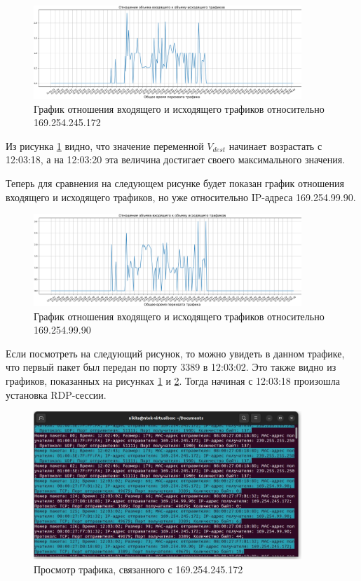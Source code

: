 \documentclass[bachelor, och, coursework]{SCWorks}
\begin{document}
  \begin{figure}[H]
    \centering
    \includegraphics[width=0.9\textwidth]{photo/clnt1.png}
    \caption{График отношения входящего и исходящего трафиков относительно 169.254.245.172}
    \label{clnt1}
  \end{figure}

  Из рисунка \ref{clnt1} видно, что значение переменной $V_{dest}$ начинает возрастать с 12:03:18, а на 12:03:20 эта величина достигает
  своего максимального значения.

  Теперь для сравнения на следующем рисунке будет показан график отношения входящего и исходящего трафиков, но уже относительно IP-адреса 169.254.99.90.

  \begin{figure}[H]
    \centering
    \includegraphics[width=0.9\textwidth]{photo/serv1.png}
    \caption{График отношения входящего и исходящего трафиков относительно 169.254.99.90}
    \label{serv1}
  \end{figure}

  Если посмотреть на следующий рисунок, то можно увидеть в данном трафике, что первый пакет был передан по порту 3389 в 12:03:02. Это также видно из
  графиков, показанных на рисунках \ref{clnt1} и \ref{serv1}. Тогда начиная с 12:03:18 произошла установка RDP-сессии.
  
  \begin{figure}[H]
    \centering
    \includegraphics[width=0.9\textwidth]{photo/traffic-1.jpg}
    \caption{Просмотр трафика, связанного с 169.254.245.172}
    \label{traf1}
  \end{figure}
  
\end{document}
